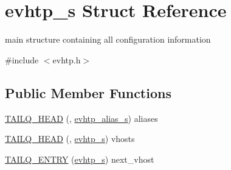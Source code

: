 \hypertarget{structevhtp__s}{\section{evhtp\-\_\-s \-Struct \-Reference}
\label{structevhtp__s}
}


main structure containing all configuration information  




{\ttfamily \#include $<$evhtp.\-h$>$}

\subsection*{\-Public \-Member \-Functions}
\begin{DoxyCompactItemize}
\item 
\hyperlink{structevhtp__s_a7c3276340515ffaf4c81acf83e74b488}{\-T\-A\-I\-L\-Q\-\_\-\-H\-E\-A\-D} (, \hyperlink{structevhtp__alias__s}{evhtp\-\_\-alias\-\_\-s}) aliases
\item 
\hyperlink{structevhtp__s_a671ea539b6cc9654bf0fa080a7197b0b}{\-T\-A\-I\-L\-Q\-\_\-\-H\-E\-A\-D} (, \hyperlink{structevhtp__s}{evhtp\-\_\-s}) vhosts
\item 
\hyperlink{structevhtp__s_a0559b45940aab93bfdcbb46b0c5fb0a1}{\-T\-A\-I\-L\-Q\-\_\-\-E\-N\-T\-R\-Y} (\hyperlink{structevhtp__s}{evhtp\-\_\-s}) next\-\_\-vhost
\end{DoxyCompactItemize}
